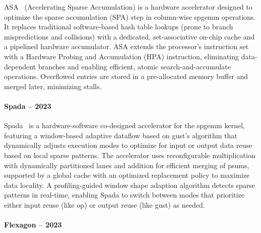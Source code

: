 ASA~\cite{Zhang2022_ASA} (Accelerating Sparse Accumulation) is a hardware accelerator designed to optimize the sparse accumulation (SPA) step in column-wise \acrshort{spgemm} operations.
It replaces traditional software-based hash table lookups (prone to branch mispredictions and collisions) with a dedicated, \gls{set}-associative on-chip cache and a pipelined hardware accumulator.
ASA extends the processor's instruction set with a Hardware Probing and Accumulation (HPA) instruction, eliminating data-dependent branches and enabling efficient, atomic search-and-accumulate operations.
Overflowed entries are stored in a pre-allocated memory buffer and merged later, minimizing stalls.

\paragraph{Spada -- 2023}

Spada~\cite{Li2023_Spada} is a hardware-software co-designed accelerator for the \acrshort{spgemm} kernel, featuring a window-based adaptive dataflow based on \acrlong{gust}'s algorithm that dynamically adjusts execution modes to optimize for input or output data reuse based on local sparse patterns.
The accelerator uses reconfigurable multiplication  with dynamically partitioned lanes and addition  for efficient merging of \glspl{psum}, supported by a global cache with an optimized replacement policy to maximize data locality.
A profiling-guided window shape adaption algorithm detects sparse patterns in real-time, enabling Spada to switch between modes that prioritize either input reuse (like \acrlong{op}) or output reuse (like \acrlong{gust}) as needed.

\paragraph{Flexagon -- 2023}

